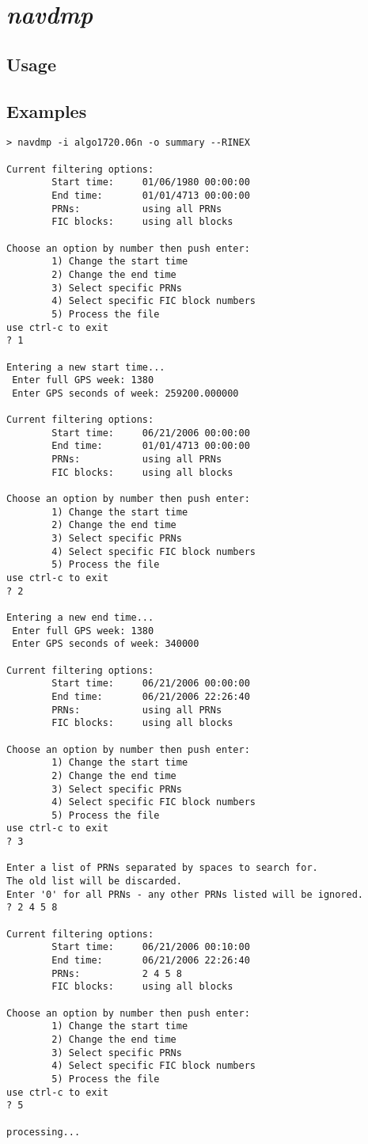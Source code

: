 \section{\emph{navdmp}}
\subsection{Usage}
\subsection{Examples}
\begin{Verbatim}
> navdmp -i algo1720.06n -o summary --RINEX

Current filtering options:
        Start time:     01/06/1980 00:00:00
        End time:       01/01/4713 00:00:00
        PRNs:           using all PRNs
        FIC blocks:     using all blocks

Choose an option by number then push enter:
        1) Change the start time
        2) Change the end time
        3) Select specific PRNs
        4) Select specific FIC block numbers
        5) Process the file
use ctrl-c to exit
? 1

Entering a new start time...
 Enter full GPS week: 1380
 Enter GPS seconds of week: 259200.000000

Current filtering options:
        Start time:     06/21/2006 00:00:00
        End time:       01/01/4713 00:00:00
        PRNs:           using all PRNs
        FIC blocks:     using all blocks

Choose an option by number then push enter:
        1) Change the start time
        2) Change the end time
        3) Select specific PRNs
        4) Select specific FIC block numbers
        5) Process the file
use ctrl-c to exit
? 2

Entering a new end time...
 Enter full GPS week: 1380
 Enter GPS seconds of week: 340000

Current filtering options:
        Start time:     06/21/2006 00:00:00
        End time:       06/21/2006 22:26:40
        PRNs:           using all PRNs
        FIC blocks:     using all blocks

Choose an option by number then push enter:
        1) Change the start time
        2) Change the end time
        3) Select specific PRNs
        4) Select specific FIC block numbers
        5) Process the file
use ctrl-c to exit
? 3

Enter a list of PRNs separated by spaces to search for.
The old list will be discarded.
Enter '0' for all PRNs - any other PRNs listed will be ignored.
? 2 4 5 8

Current filtering options:
        Start time:     06/21/2006 00:10:00
        End time:       06/21/2006 22:26:40
        PRNs:           2 4 5 8
        FIC blocks:     using all blocks

Choose an option by number then push enter:
        1) Change the start time
        2) Change the end time
        3) Select specific PRNs
        4) Select specific FIC block numbers
        5) Process the file
use ctrl-c to exit
? 5

processing...
\end{Verbatim}

